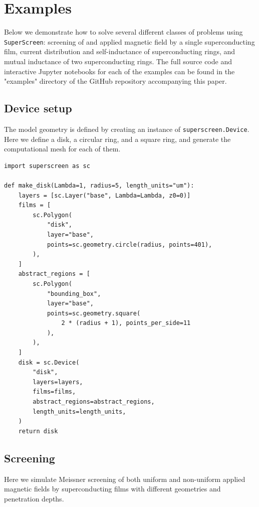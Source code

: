 \documentclass[preprint,12pt]{elsarticle}
\begin{document}
\section{Examples}
\label{section:examples}

Below we demonstrate how to solve several different classes of problems using \texttt{SuperScreen}: screening of and applied magnetic field by a single superconducting film, current distribution and self-inductance of superconducting rings, and mutual inductance of two superconducting rings. The full source code and interactive Jupyter notebooks for each of the examples can be found in the "examples" directory of the GitHub repository accompanying this paper.

\subsection{Device setup}
\label{section:example:setup}

The model geometry is defined by creating an instance of \texttt{superscreen.Device}. Here we define a disk, a circular ring, and a square ring, and generate the computational mesh for each of them.

\begin{verbatim}
import superscreen as sc

def make_disk(Lambda=1, radius=5, length_units="um"):
    layers = [sc.Layer("base", Lambda=Lambda, z0=0)]
    films = [
        sc.Polygon(
            "disk",
            layer="base",
            points=sc.geometry.circle(radius, points=401),
        ),
    ]
    abstract_regions = [
        sc.Polygon(
            "bounding_box",
            layer="base",
            points=sc.geometry.square(
                2 * (radius + 1), points_per_side=11
            ),
        ),
    ]
    disk = sc.Device(
        "disk",
        layers=layers,
        films=films,
        abstract_regions=abstract_regions,
        length_units=length_units,
    )
    return disk
\end{verbatim}

\subsection{Screening}
\label{section:example:screening}

Here we simulate Meissner screening of both uniform and non-uniform applied magnetic fields by superconducting films with different geometries and penetration depths. 
\end{document}
